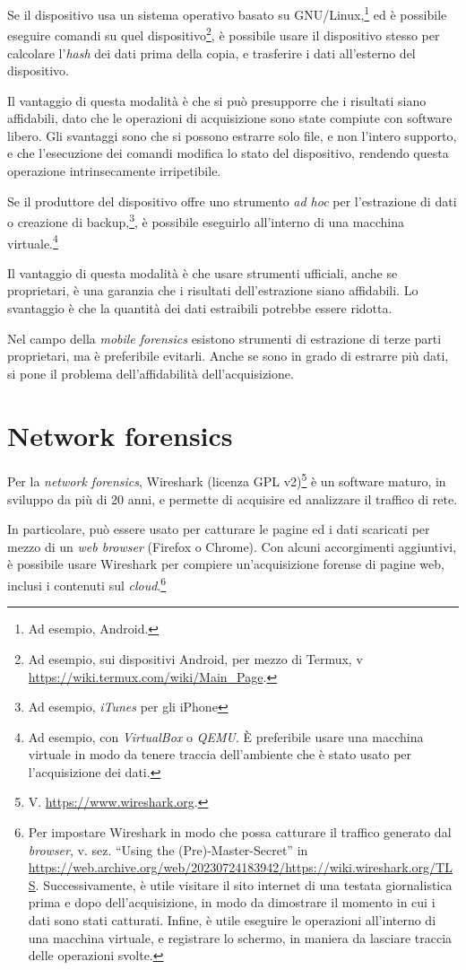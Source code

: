 \documentclass[
  12pt,
  a4paper,
]{book}
\begin{document}
Se il dispositivo usa un sistema operativo basato su
GNU/Linux,\footnote{Ad esempio, Android.} ed è possibile eseguire
comandi su quel dispositivo\footnote{Ad esempio, sui dispositivi
  Android, per mezzo di Termux, v
  \url{https://wiki.termux.com/wiki/Main_Page}.}, è possibile usare il
dispositivo stesso per calcolare l'\emph{hash} dei dati prima della
copia, e trasferire i dati all'esterno del dispositivo.

Il vantaggio di questa modalità è che si può presupporre che i risultati
siano affidabili, dato che le operazioni di acquisizione sono state
compiute con software libero. Gli svantaggi sono che si possono estrarre
solo file, e non l'intero supporto, e che l'esecuzione dei comandi
modifica lo stato del dispositivo, rendendo questa operazione
intrinsecamente irripetibile.

Se il produttore del dispositivo offre uno strumento \emph{ad hoc} per
l'estrazione di dati o creazione di backup,\footnote{Ad esempio,
  \emph{iTunes} per gli iPhone}, è possibile eseguirlo all'interno di
una macchina virtuale.\footnote{Ad esempio, con \emph{VirtualBox} o
  \emph{QEMU}. È preferibile usare una macchina virtuale in modo da
  tenere traccia dell'ambiente che è stato usato per l'acquisizione dei
  dati.}

Il vantaggio di questa modalità è che usare strumenti ufficiali, anche
se proprietari, è una garanzia che i risultati dell'estrazione siano
affidabili. Lo svantaggio è che la quantità dei dati estraibili potrebbe
essere ridotta.

Nel campo della \emph{mobile forensics} esistono strumenti di estrazione
di terze parti proprietari, ma è preferibile evitarli. Anche se sono in
grado di estrarre più dati, si pone il problema dell'affidabilità
dell'acquisizione.

\section{Network forensics}\label{network-forensics}

Per la \emph{network forensics}, Wireshark (licenza GPL v2)\footnote{V.
  \url{https://www.wireshark.org}.} è un software maturo, in sviluppo da
più di 20 anni, e permette di acquisire ed analizzare il traffico di
rete.

In particolare, può essere usato per catturare le pagine ed i dati
scaricati per mezzo di un \emph{web browser} (Firefox o Chrome). Con
alcuni accorgimenti aggiuntivi, è possibile usare Wireshark per compiere
un'acquisizione forense di pagine web, inclusi i contenuti sul
\emph{cloud}.\footnote{Per impostare Wireshark in modo che possa
  catturare il traffico generato dal \emph{browser}, v. sez. ``Using the
  (Pre)-Master-Secret'' in
  \url{https://web.archive.org/web/20230724183942/https://wiki.wireshark.org/TLS}.
  Successivamente, è utile visitare il sito internet di una testata
  giornalistica prima e dopo dell'acquisizione, in modo da dimostrare il
  momento in cui i dati sono stati catturati. Infine, è utile eseguire
  le operazioni all'interno di una macchina virtuale, e registrare lo
  schermo, in maniera da lasciare traccia delle operazioni svolte.}
\end{document}
